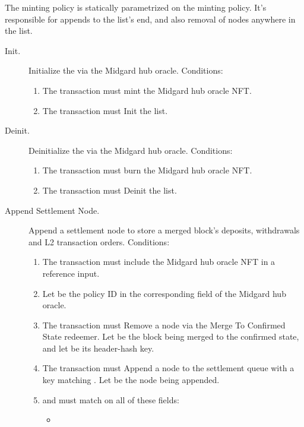 \documentclass[../midgard.tex]{subfiles}
\begin{document}
The  minting policy is statically parametrized on the  minting policy.
It's responsible for appends to the  list's end, and also removal of nodes anywhere in the list.
\begin{description}
  \item[Init.] Initialize the  via the Midgard hub oracle.
    Conditions:
      \begin{enumerate}
        \item The transaction must mint the Midgard hub oracle NFT.
        \item The transaction must Init the  list.
      \end{enumerate}
  \item[Deinit.] Deinitialize the  via the Midgard hub oracle.
    Conditions:
      \begin{enumerate}
          \item The transaction must burn the Midgard hub oracle NFT.
          \item The transaction must Deinit the  list.
      \end{enumerate}
  \item[Append Settlement Node.] Append a settlement node to store a merged block's deposits, withdrawals and L2 transaction orders.
    Conditions:
      \begin{enumerate}
        \item The transaction must include the Midgard hub oracle NFT in a reference input.
        \item Let  be the policy ID in the corresponding field of the Midgard hub oracle.
        \item The transaction must Remove a  node via the Merge To Confirmed State redeemer.
          Let  be the block being merged to the confirmed state, and let  be its header-hash key.
        \item The transaction must Append a node to the settlement queue with a key matching .
          Let  be the node being appended.
        \item {} and  must match on all of these fields:
          \begin{itemize}
            \item {}

\end{itemize}
\end{enumerate}
\end{description}
\end{document}
